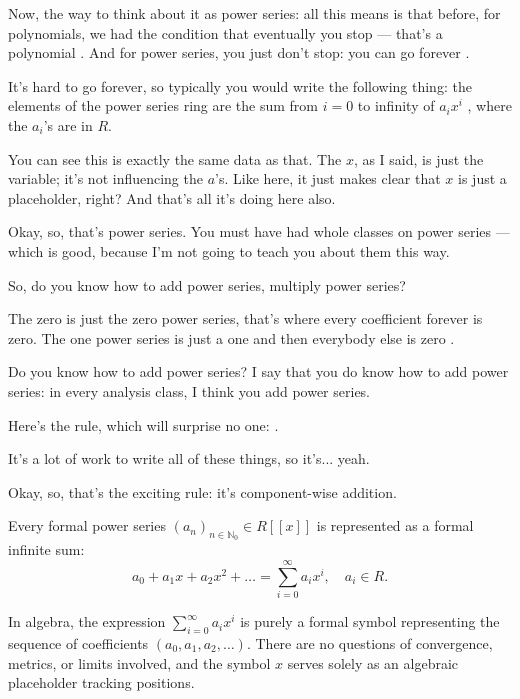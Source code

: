 \begin{speech}[00:27:02 - 00:29:00]
Now, the way to think about it as power series: all this means is that before, for polynomials, we had the condition that eventually you stop --- that's a polynomial . And for power series, you just don't stop: you can go forever .

It's hard to go forever, so typically you would write the following thing: the elements of the power series ring are the sum from $i = 0$ to infinity of $a_i x^i$ , where the $a_i$'s are in $R$.

You can see this is exactly the same data as that. The $x$, as I said, is just the variable; it's not influencing the $a$'s. Like here, it just makes clear that $x$ is just a placeholder, right? And that's all it's doing here also.

Okay, so, that's power series. You must have had whole classes on power series --- which is good, because I'm not going to teach you about them this way.

So, do you know how to add power series, multiply power series?

The zero is just the zero power series, that's where every coefficient forever is zero. The one power series is just a one and then everybody else is zero .

Do you know how to add power series? I say that you do know how to add power series: in every analysis class, I think you add power series.

Here's the rule, which will surprise no one: .

It's a lot of work to write all of these things, so it's... yeah.

Okay, so, that's the exciting rule: it's component-wise addition.
\end{speech}

\begin{content}
Every formal power series $(a_n)_{n \in \mathbb{N}_0} \in R[[x]]$ is represented as a formal infinite sum:
\begin{equation}\label{eq:power-series-sum-notation}
a_0 + a_1 x + a_2 x^2 + \dots = \sum_{i=0}^\infty a_i x^i, \quad a_i \in R.
\end{equation}

\begin{steps}
In algebra, the expression $\sum_{i=0}^\infty a_i x^i$ is purely a formal symbol representing the sequence of coefficients $(a_0, a_1, a_2, \dots)$. There are no questions of convergence, metrics, or limits involved, and the symbol $x$ serves solely as an algebraic placeholder tracking positions.
\end{steps}
\end{content}

